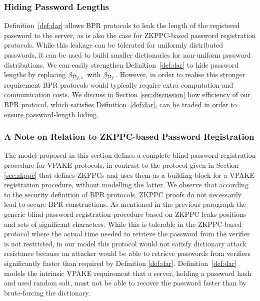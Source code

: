 \subsubsection{Hiding Password Lengths}\label{sec:strongerDAR}
Definition~\ref{def:dar} allows \ac{BPR} protocols to leak the length of the registered password to the server, as is also the case for \ac{ZKPPC}-based password registration protocols. 
While this leakage can be tolerated for uniformly distributed passwords, it can be used to build smaller dictionaries for non-uniform password distributions. 
We can easily strengthen Definition~\ref{def:dar} to hide password lengths by replacing $\beta_{\mathcal{D}_{f,n}}$ with $\beta_{\mathcal{D}_f}$. 
However, in order to realise this stronger requirement \ac{BPR} protocols would typically require extra computation and communication costs. 
We discuss in Section \ref{sec:discussion} how efficiency of our \ac{BPR} protocol, which satisfies Definition~\ref{def:dar}, can be traded in order to ensure password-length hiding.

\subsubsection{A Note on Relation to ZKPPC-based Password Registration}
The model proposed in this section defines a complete blind password registration procedure for \ac{VPAKE} protocols, in contrast to the protocol given in Section \ref{sec:zkppc} that defines \acp{ZKPPC} and uses them as a building block for a \ac{VPAKE} registration procedure, without modelling the latter. 
We observe that according to the security definition of \ac{BPR} protocols, \ac{ZKPPC} proofs do not necessarily lead to secure \ac{BPR} constructions. 
As mentioned in the previous paragraph the generic blind password registration procedure based on \ac{ZKPPC} leaks positions and sets of significant characters. 
While this is tolerable in the \ac{ZKPPC}-based protocol where the actual time needed to retrieve the password from the verifier is not restricted, in our model this protocol would not satisfy dictionary attack resistance because an attacker would be able to retrieve passwords from verifiers significantly faster than required by Definition \ref{def:dar}.
Definition~\ref{def:dar} models the intrinsic \ac{VPAKE} requirement that a server, holding a password hash and used random salt, must not be able to recover the password faster than by brute-forcing the dictionary. 

